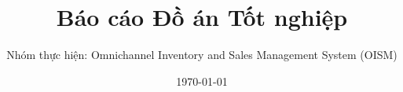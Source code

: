 \documentclass[a4paper,12pt]{book}
\begin{document}
\sloppy
\frontmatter
\title{Báo cáo Đồ án Tốt nghiệp}
\author{Nhóm thực hiện: Omnichannel Inventory and Sales Management System (OISM)}
\date{\today}
\maketitle

\tableofcontents
\clearpage
\listoffigures
{}
\clearpage
\listoftables
{}
\clearpage

\mainmatter







\clearpage


\end{document}
